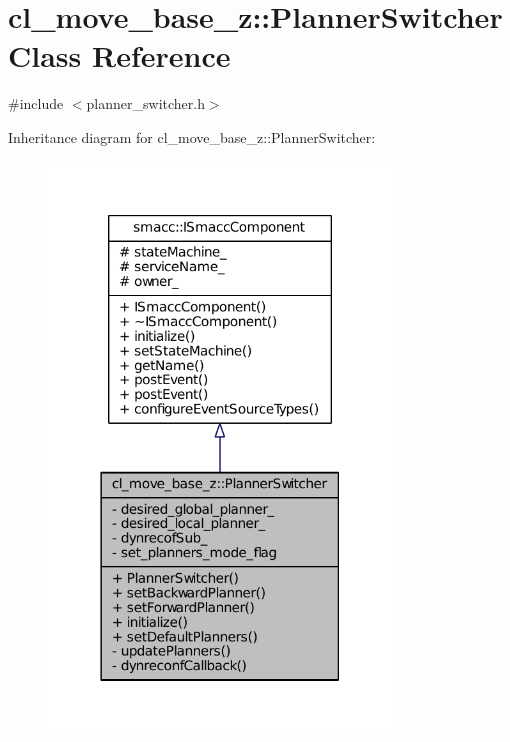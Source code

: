 \hypertarget{classcl__move__base__z_1_1PlannerSwitcher}{}\section{cl\+\_\+move\+\_\+base\+\_\+z\+:\+:Planner\+Switcher Class Reference}
\label{classcl__move__base__z_1_1PlannerSwitcher}


{\ttfamily \#include $<$planner\+\_\+switcher.\+h$>$}



Inheritance diagram for cl\+\_\+move\+\_\+base\+\_\+z\+:\+:Planner\+Switcher\+:
\nopagebreak
\begin{figure}[H]
\begin{center}
\leavevmode
\includegraphics[width=258pt]{classcl__move__base__z_1_1PlannerSwitcher__inherit__graph}
\end{center}
\end{figure}


